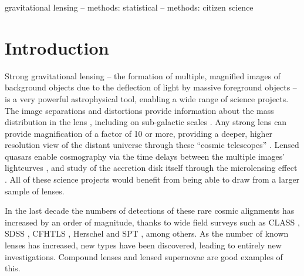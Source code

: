 \documentclass[useAMS,usenatbib,a4paper]{mn2e}
\begin{document}

\begin{keywords}
  gravitational lensing   --
  methods: statistical    --
  methods: citizen science
\end{keywords}

\setcounter{footnote}{1}


\section{Introduction}
\label{sec:intro}


Strong gravitational lensing -- the formation of multiple, magnified images of
background objects due to the deflection of light by  massive foreground
objects -- is a very powerful astrophysical tool, enabling a wide range of
science projects. The image separations and distortions provide information
about the mass distribution in the lens \citep[e.g.][]{AugerEtal2010,
SonnenfeldEtal2012,SonnenfeldEtal2013}, including on sub-galactic scales
\citep[e.g.][]{Dalal+Kochanek2002,VegettiEtal2010,HezavehEtal2013}. Any
strong lens can provide magnification of a factor of 10 or more, providing a
deeper, higher resolution view of the distant universe through these ``cosmic
telescopes'' \citep[e.g.][]{StarkEtal2008,NewtonEtal2011}. Lensed quasars enable
cosmography via the time delays between the multiple images' lightcurves
\citep[e.g.][]{TewesEtal2013,SuyuEtal2013}, and study of the accretion disk itself
through the microlensing effect \citep[e.g.][]{PoindexterEtal2008}. All of these
science projects would benefit from being able to draw from a larger sample of
lenses.

In the last decade the numbers of detections of these rare cosmic alignments
has increased by an order of magnitude, thanks to wide field surveys such as
CLASS \citep[e.g.]{BrowneEtal2003}, SDSS \citep[e.g.][]
{BoltonEtal2006,AugerEtal2010b,TreuEtal2011,InadaEtal2012}, CFHTLS
\citep[e.g.][]{MoreEtal2012,GavazziEtal2014}, Herschel
\citep[][]{NegrelloEtal2014} and SPT \citep[e.g.][]{VieiraEtal2013}, among
others.  As the number of known lenses has increased, new types have been
discovered, leading to entirely new investigations. Compound lenses
\citep{GavazziEtal2008,CollettEtal2012} and lensed supernovae
\citep{QuimbyEtal2014} are good examples of this. 
\end{document}
